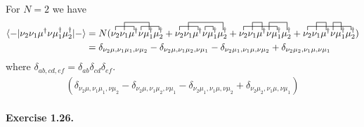 \documentclass[12pt]{article}
\newcommand{\la}{\langle}
\newcommand{\ra}{\rangle}
\newcommand{\da}{\dagger}
\begin{document}
\begin{tcolorbox}[title = Exercise 1.24. // Solution, breakable]
    For $N=2$ we have
    \begin{align*}
	    \la - | \nu_2\nu_1\mu^\da 
	        \nu \mu_1^\da\mu_2^\da| - \ra
        &= N(
        \contraction{}{\nu_2}{\nu_1}{\mu^\da}
        \contraction[2ex]{\nu_2}{\nu_1}{\mu^\da \nu}{\mu_1^\da}
        \contraction{\nu_2\nu_1\mu^\da}{\nu}{\mu_1^\da}{\mu_2^\da}
        \nu_2\nu_1\mu^\da \nu \mu_1^\da\mu_2^\da
        +
        \contraction{}{\nu_2}{\nu_1}{\mu^\da}
        \contraction[2ex]{\nu_2}{\nu_1}{\mu^\da \nu\mu_1^\da}{\mu_2^\da}
        \contraction{\nu_2\nu_1\mu^\da}{\nu}{}{\mu_1^\da}
        \nu_2\nu_1\mu^\da \nu \mu_1^\da\mu_2^\da
        +
        \contraction{}{\nu_2}{\nu_1\mu^\da\nu}{\mu_1^\da}
        \contraction[2ex]{\nu_2}{\nu_1}{}{\mu^\da}
        \contraction[2ex]{\nu_2\nu_1\mu^\da}{\nu}{\mu_1^\da}{\mu_2^\da}
        \nu_2\nu_1\mu^\da \nu \mu_1^\da\mu_2^\da+
        \contraction{}{\nu_2}{\nu_1\mu^\da\nu\mu_1^\da}{\mu_2^\da}
        \contraction[2ex]{\nu_2}{\nu_1}{}{\mu^\da}
        \contraction[2ex]{\nu_2\nu_1\mu^\da}{\nu}{}{\mu_2^\da}
        \nu_2\nu_1\mu^\da \nu \mu_1^\da\mu_2^\da
        )\\
    &=\delta_{\nu_2\mu,\nu_1\mu_1,\nu\mu_2}
    -\delta_{\nu_2\mu,\nu_1\mu_2,\nu\mu_1}
    -\delta_{\nu_2\mu_1,\nu_1\mu,\nu\mu_2}
    +\delta_{\nu_2\mu_2,\nu_1\mu,\nu\mu_1}
    \end{align*}
    where $\delta_{ab,cd,ef}=\delta_{ab}\delta_{cd}\delta_{ef}$.
    \begin{align*}
	    (\delta_{\nu_2\mu,\nu_1\mu_1,\nu\mu_2}
    -\delta_{\nu_2\mu,\nu_1\mu_2,\nu\mu_1}
    -\delta_{\nu_2\mu_1,\nu_1\mu,\nu\mu_2}
    +\delta_{\nu_2\mu_2,\nu_1\mu,\nu\mu_1})
    \end{align*}
\end{tcolorbox}

\paragraph{Exercise 1.26.}
\label{par:ex1.26}
\end{document}
